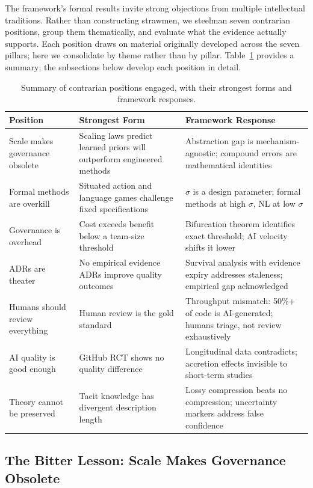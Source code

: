 \documentclass[11pt, a4paper]{googledeepmind}
\begin{document}
The framework's formal results invite strong objections from multiple intellectual
traditions.  Rather than constructing strawmen, we steelman seven contrarian
positions, group them thematically, and evaluate what the evidence actually
supports.  Each position draws on material originally developed across the
seven pillars; here we consolidate by theme rather than by pillar.  Table~\ref{tab:contrarian-summary} provides a summary; the subsections below
develop each position in detail.

\begin{table}[t]
\centering
\small
\begin{tabular}{lp{4.5cm}p{4.5cm}}
\toprule
\textbf{Position} & \textbf{Strongest Form} & \textbf{Framework Response} \\
\midrule
Scale makes governance obsolete & Scaling laws predict learned priors will outperform engineered methods & Abstraction gap is mechanism-agnostic; compound errors are mathematical identities \\
Formal methods are overkill & Situated action and language games challenge fixed specifications & $\sigma$ is a design parameter; formal methods at high $\sigma$, NL at low $\sigma$ \\
Governance is overhead & Cost exceeds benefit below a team-size threshold & Bifurcation theorem identifies exact threshold; AI velocity shifts it lower \\
ADRs are theater & No empirical evidence ADRs improve quality outcomes & Survival analysis with evidence expiry addresses staleness; empirical gap acknowledged \\
Humans should review everything & Human review is the gold standard & Throughput mismatch: 50\%+ of code is AI-generated; humans triage, not review exhaustively \\
AI quality is good enough & GitHub RCT shows no quality difference & Longitudinal data contradicts; accretion effects invisible to short-term studies \\
Theory cannot be preserved & Tacit knowledge has divergent description length & Lossy compression beats no compression; uncertainty markers address false confidence \\
\bottomrule
\end{tabular}
\caption{Summary of contrarian positions engaged, with their strongest forms and framework responses.}
\label{tab:contrarian-summary}
\end{table}

\subsection{The Bitter Lesson: Scale Makes Governance Obsolete}
\label{sec:contrarian-bitter}
\end{document}
